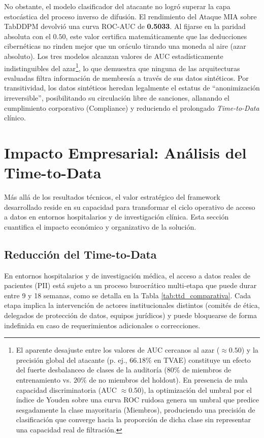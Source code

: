 No obstante, el modelo clasificador del atacante no logró superar la capa estocástica del proceso inverso de difusión. El rendimiento del Ataque MIA sobre TabDDPM devolvió una curva ROC-AUC de \textbf{0.5033}. Al fijarse en la paridad absoluta con el $0.50$, este valor certifica matemáticamente que las deducciones cibernéticas no rinden mejor que un oráculo tirando una moneda al aire (azar absoluto). Los tres modelos alcanzan valores de AUC estadísticamente indistinguibles del azar\footnote{El aparente desajuste entre los valores de AUC cercanos al azar ($\approx 0.50$) y la precisión global del atacante (p. ej., $66.18\%$ en TVAE) constituye un efecto del fuerte desbalanceo de clases de la auditoría ($80\%$ de miembros de entrenamiento vs. $20\%$ de no miembros del holdout). En presencia de nula capacidad discriminatoria (AUC $\approx 0.50$), la optimización del umbral por el índice de Youden sobre una curva ROC ruidosa genera un umbral que predice sesgadamente la clase mayoritaria (Miembros), produciendo una precisión de clasificación que converge hacia la proporción de dicha clase sin representar una capacidad real de filtración.}, lo que demuestra que ninguna de las arquitecturas evaluadas filtra información de membresía a través de sus datos sintéticos. Por transitividad, los datos sintéticos heredan legalmente el estatus de ``anonimización irreversible'', posibilitando su circulación libre de sanciones, allanando el cumplimiento corporativo (Compliance) y reduciendo el prolongado \textit{Time-to-Data} clínico.

\section{Impacto Empresarial: Análisis del Time-to-Data}

Más allá de los resultados técnicos, el valor estratégico del framework desarrollado reside en su capacidad para transformar el ciclo operativo de acceso a datos en entornos hospitalarios y de investigación clínica. Esta sección cuantifica el impacto económico y organizativo de la solución.

\subsection{Reducción del Time-to-Data}

En entornos hospitalarios y de investigación médica, el acceso a datos reales de pacientes (PII) está sujeto a un proceso burocrático multi-etapa que puede durar entre 9 y 18 semanas, como se detalla en la Tabla \ref{tab:ttd_comparativa}. Cada etapa implica la intervención de actores institucionales distintos (comités de ética, delegados de protección de datos, equipos jurídicos) y puede bloquearse de forma indefinida en caso de requerimientos adicionales o correcciones.


